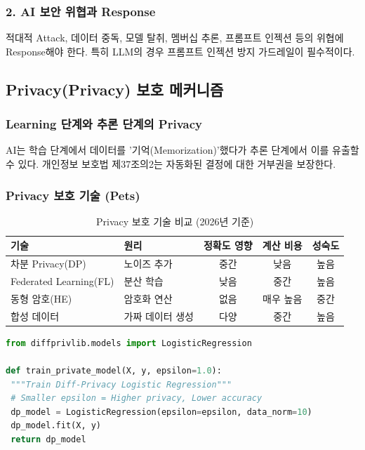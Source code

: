 \subsubsection*{2. AI 보안 위협과 Response}
적대적 Attack, 데이터 중독, 모델 탈취, 멤버십 추론, 프롬프트 인젝션 등의 위협에 Response해야 한다. 특히 LLM의 경우 프롬프트 인젝션 방지 가드레일이 필수적이다.

\subsection{Privacy(Privacy) 보호 메커니즘}

\subsubsection*{Learning 단계와 추론 단계의 Privacy}
AI는 학습 단계에서 데이터를 '기억(Memorization)'했다가 추론 단계에서 이를 유출할 수 있다.\cite{dwork2014algorithmic, price2019privacy} 개인정보 보호법 제37조의2는 자동화된 결정에 대한 거부권을 보장한다.

\subsubsection*{Privacy 보호 기술 (Pets)}
\begin{table}[h]
\centering
\caption{Privacy 보호 기술 비교 (2026년 기준)}
\begin{tabular}{|l|p{2.5cm}|c|c|c|}
\hline
\textbf{기술} & \textbf{원리} & \textbf{정확도 영향} & \textbf{계산 비용} & \textbf{성숙도} \\ \hline
차분 Privacy(DP) & 노이즈 추가 & 중간 & 낮음 & 높음 \\ \hline
Federated Learning(FL) & 분산 학습 & 낮음 & 중간 & 높음 \\ \hline
동형 암호(HE) & 암호화 연산 & 없음 & 매우 높음 & 중간 \\ \hline
합성 데이터 & 가짜 데이터 생성 & 다양 & 중간 & 높음 \\ \hline
\end{tabular}
\end{table}

\begin{lstlisting}[language=Python, caption={Differential Privacy Application Example}, label={code:dp-example}]
from diffprivlib.models import LogisticRegression

def train_private_model(X, y, epsilon=1.0):
 """Train Diff-Privacy Logistic Regression"""
 # Smaller epsilon = Higher privacy, Lower accuracy
 dp_model = LogisticRegression(epsilon=epsilon, data_norm=10)
 dp_model.fit(X, y)
 return dp_model
\end{lstlisting}

